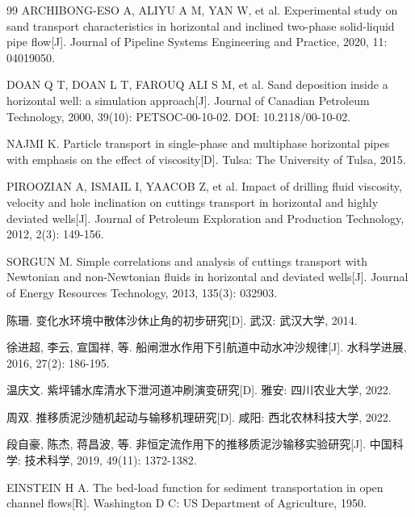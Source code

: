 \begin{thebibliography}{99}
ARCHIBONG-ESO A, ALIYU A M, YAN W, et al. Experimental study on sand transport characteristics in horizontal and inclined two-phase solid-liquid pipe flow[J]. Journal of Pipeline Systems Engineering and Practice, 2020, 11: 04019050.

DOAN Q T, DOAN L T, FAROUQ ALI S M, et al. Sand deposition inside a horizontal well: a simulation approach[J]. Journal of Canadian Petroleum Technology, 2000, 39(10): PETSOC-00-10-02. DOI: 10.2118/00-10-02.

NAJMI K. Particle transport in single-phase and multiphase horizontal pipes with emphasis on the effect of viscosity[D]. Tulsa: The University of Tulsa, 2015.

PIROOZIAN A, ISMAIL I, YAACOB Z, et al. Impact of drilling fluid viscosity, velocity and hole inclination on cuttings transport in horizontal and highly deviated wells[J]. Journal of Petroleum Exploration and Production Technology, 2012, 2(3): 149-156.

SORGUN M. Simple correlations and analysis of cuttings transport with Newtonian and non-Newtonian fluids in horizontal and deviated wells[J]. Journal of Energy Resources Technology, 2013, 135(3): 032903.

陈珊. 变化水环境中散体沙休止角的初步研究[D]. 武汉: 武汉大学, 2014.

徐进超, 李云, 宣国祥, 等. 船闸泄水作用下引航道中动水冲沙规律[J]. 水科学进展, 2016, 27(2): 186-195.

温庆文. 紫坪铺水库清水下泄河道冲刷演变研究[D]. 雅安: 四川农业大学, 2022.

周双. 推移质泥沙随机起动与输移机理研究[D]. 咸阳: 西北农林科技大学, 2022.

段自豪, 陈杰, 蒋昌波, 等. 非恒定流作用下的推移质泥沙输移实验研究[J]. 中国科学: 技术科学, 2019, 49(11): 1372-1382.

EINSTEIN H A. The bed-load function for sediment transportation in open channel flows[R]. Washington D C: US Department of Agriculture, 1950.


\end{thebibliography}
